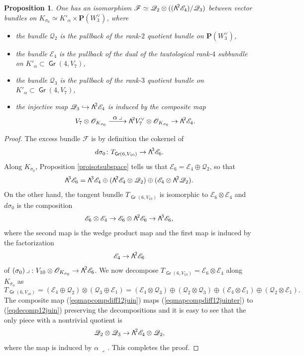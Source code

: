 \documentclass[11pt]{article}
\let\mathcal\mathscr
\newcommand\hto{\mathrel{\lhook\joinrel\to}}
\newcommand\To[1]{\mathchoice{\xrightarrow{\textstyle\kern4pt#1\kern3pt}}{\stackrel{#1}{\longrightarrow}}{}{}}
\newtheorem{prop}[lemm]{Proposition}
\theoremstyle{definition}
\renewcommand\P{{\mathbf P}}\let\PP\P
\newcommand\cE{\mathcal{E}}
\newcommand\cF{\mathcal{F}}
\newcommand\cO{\mathcal{O}}\let\OO\cO
\newcommand\cQ{\mathcal{Q}}\let\quotauto\cQ
\DeclareMathOperator{\Gr}{\mathsf{Gr}}
\let\isom\simeq
\let\cong\simeq
\newcommand\bw[1]{{\hbox{\large$\mathsf{\Lambda}$}^{\!#1}}}
\begin{document}
\begin{prop}\label{proexcessalphabeta}
One has an isomorphism $\cF\cong \cQ_2\otimes((\bw2\cE_4)/\cQ_3)$ between vector bundles on $K_{\sigma_0}\isom K'_\alpha\times \P(W_3^\vee)$, where
\begin{itemize}
\item the bundle $\cQ_2$ is the pullback of
the rank-$2$ quotient bundle on $\P(W_3^\vee)$,
\item the bundle $\cE_4$ is the pullback of the dual of
the tautological rank-$4$ subbundle on $K'_\alpha\subset \Gr(4,V_7)$,
\item the bundle $\cQ_3$ is the pullback of
the rank-$3$ quotient bundle on $K'_\alpha\subset \Gr(4,V_7)$,
\item the injective map $\cQ_3\hto \bw2\cE_4$ is induced by the composite map
\[
V_7\otimes \cO_{K_{\sigma_0}}\To{\alpha\,\lrcorner} \bw2V_7^\vee\otimes \cO_{K_{\sigma_0}}\to \bw2\cE_4
.
\]
\end{itemize}
\end{prop}

\begin{proof} The excess bundle $\cF$ is by definition the cokernel of
\[
d\sigma_0\colon T_{\Gr(6,V_{10})}\to \bw3\cE_6.
\]
Along $K_{\sigma_0}$, Proposition \ref{proisotsubspace} tells us that
$\cE_6=\cE_4\oplus\cQ_2$, so that
\begin{equation}\label{eqdecomp12juin}
\bw3\cE_6=\bw3\cE_4\oplus
(\bw2\cE_4\otimes \cQ_2)\oplus (\cE_4\otimes \bw2\cQ_2).
\end{equation}
On the other hand, the tangent bundle $T_{\Gr(6,V_{10})}$ is isomorphic to
$\cE_6\otimes \cE_4$ and
$d\sigma_0$ is the composition
\begin{equation}\label{eqmapcompdiff12juin}
\cE_6\otimes \cE_4\to \cE_6\otimes \bw2\cE_6\to \bw3\cE_6,
\end{equation}
where the second map is the wedge product map and the first map is
induced by the factorization
\[
\cE_4\to \bw2\cE_6
\]
of $(\sigma_0)\,\lrcorner\,\colon V_{10}\otimes \cO_{K_{\sigma_0}}\to \bw2\cE_6$. We now decompose
$T_{\Gr(6,V_{10})}=\cE_6\otimes \cE_4$ along $K_{\sigma_0}$ as
\begin{equation}\label{eqmapcompdiff12juinter}
T_{\Gr(6,V_{10})}=(\cE_4\oplus \cQ_2)\otimes (\cQ_3\oplus \cE_1)
=(\cE_4\otimes \cQ_3)\oplus( \cQ_2\otimes \cQ_3)\oplus
(\cE_4\otimes\cE_1)\oplus (\cQ_2\otimes \cE_1).
\end{equation}
The composite map (\ref{eqmapcompdiff12juin}) maps (\ref{eqmapcompdiff12juinter}) to
(\ref{eqdecomp12juin}) preserving the decompositions and it is easy to see that the only piece with a nontrivial quotient is
\[
\cQ_2\otimes \cQ_3\to \bw2\cE_4\otimes \cQ_2,
\]
where the map is induced by $\alpha\,\lrcorner{}\,$. This completes the proof.
\end{proof}
\end{document}

